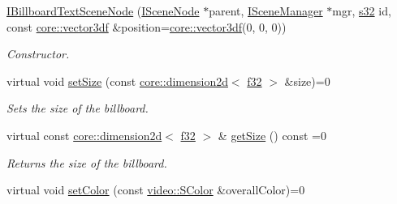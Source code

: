 \begin{DoxyCompactItemize}
\mbox{\label{classirr_1_1scene_1_1IBillboardTextSceneNode_a758a6a0ec2f76ee7623f19a55f1e7c4b}} 
\hyperlink{classirr_1_1scene_1_1IBillboardTextSceneNode_a758a6a0ec2f76ee7623f19a55f1e7c4b}{I\+Billboard\+Text\+Scene\+Node} (\hyperlink{classirr_1_1scene_1_1ISceneNode}{I\+Scene\+Node} $\ast$parent, \hyperlink{classirr_1_1scene_1_1ISceneManager}{I\+Scene\+Manager} $\ast$mgr, \hyperlink{namespaceirr_ac66849b7a6ed16e30ebede579f9b47c6}{s32} id, const \hyperlink{namespaceirr_1_1core_ae6e2b2a6c552833ebbd5b7463d03586b}{core\+::vector3df} \&position=\hyperlink{namespaceirr_1_1core_ae6e2b2a6c552833ebbd5b7463d03586b}{core\+::vector3df}(0, 0, 0))
\begin{DoxyCompactList}\small\item\em Constructor. \end{DoxyCompactList}\item 
\mbox{\label{classirr_1_1scene_1_1IBillboardTextSceneNode_a506ca9b0ef160993fc44f4e0b5b97b63}} 
virtual void \hyperlink{classirr_1_1scene_1_1IBillboardTextSceneNode_a506ca9b0ef160993fc44f4e0b5b97b63}{set\+Size} (const \hyperlink{classirr_1_1core_1_1dimension2d}{core\+::dimension2d}$<$ \hyperlink{namespaceirr_a0277be98d67dc26ff93b1a6a1d086b07}{f32} $>$ \&size)=0
\begin{DoxyCompactList}\small\item\em Sets the size of the billboard. \end{DoxyCompactList}\item 
\mbox{\label{classirr_1_1scene_1_1IBillboardTextSceneNode_aead5178207d887357fb7f3fbddcc51d6}} 
virtual const \hyperlink{classirr_1_1core_1_1dimension2d}{core\+::dimension2d}$<$ \hyperlink{namespaceirr_a0277be98d67dc26ff93b1a6a1d086b07}{f32} $>$ \& \hyperlink{classirr_1_1scene_1_1IBillboardTextSceneNode_aead5178207d887357fb7f3fbddcc51d6}{get\+Size} () const =0
\begin{DoxyCompactList}\small\item\em Returns the size of the billboard. \end{DoxyCompactList}\item 
virtual void \hyperlink{classirr_1_1scene_1_1IBillboardTextSceneNode_aaa65d10d3a49206728c47b148a64bb4a}{set\+Color} (const \hyperlink{classirr_1_1video_1_1SColor}{video\+::\+S\+Color} \&overall\+Color)=0

\end{DoxyCompactItemize}

